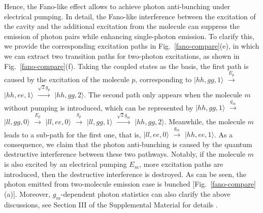 \documentclass[aps,prb,
superscriptaddress,
,twocolumn
,floatfix,footinbib,longbibliography,
]{revtex4-2}
\begin{document}
Hence, the Fano-like effect allows to achieve photon anti-bunching under electrical pumping. In detail, the Fano-like interference between the excitation of the cavity and the additional excitation from the molecule can suppress the emission of photon pairs while enhancing single-photon emission. To clarify this, we provide the corresponding excitation paths in Fig.~\ref{fano-compare}(e), in which we can extract two transition paths for two-photon excitations, as shown in Fig.~\ref{fano-compare}(f). Taking the coupled states as the basis, the first path is caused by the excitation of the molecule $p$, corresponding to $|hh,gg,1\rangle$ $\stackrel{E_{p}}{\longrightarrow}$ $|hh,ee,1\rangle$ $\stackrel{\sqrt{2}g_{p}}{\longrightarrow}$ $|hh,gg,2\rangle$. The second path only appears when the molecule $m$ without pumping is introduced, which can be  represented by $|hh,gg,1\rangle$ $\stackrel{g_{m}}{\longrightarrow}$ $|ll,gg,0\rangle$ $\stackrel{E_{p}}{\longrightarrow}$ $|ll,ee,0\rangle$ $\stackrel{g_{p}}{\longrightarrow}$ $|ll,gg,1\rangle$ $\stackrel{\sqrt{2}g_{m}}{\longrightarrow}$ $|hh,gg,2\rangle$.
Meanwhile, the molecule $m$ leads to a sub-path for the first one, that is, $|ll,ee,0\rangle$ $\stackrel{g_{m}}{\longrightarrow}$ $|hh,ee,1\rangle$.
As a consequence, we claim that the photon anti-bunching is caused by the quantum destructive interference between these two pathways. Notably, if the molecule $m$ is also excited by an electrical pumping $E_{m}$, more excitation paths are introduced, then the destructive interference is destroyed. As can be seen, the photon emitted from two-molecule emission case is bunched [Fig.~\ref{fano-compare}(a)]. Moreover, $g_{m}$-dependent photon statistics can also clarify the above discussions, see Section III of the Supplemental Material for details \cite{SupplementalMaterial}.

\end{document}
